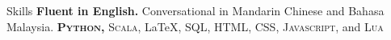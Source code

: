 
\begin{rubric}{Skills}
\textbf{Fluent in English.}  Conversational in Mandarin Chinese and Bahasa Malaysia.
\textbf{\textsc{Python,}}  
\textsc{Scala},
\LaTeX, 
SQL,
\textsc{HTML}, 
\textsc{CSS},
\textsc{Javascript}, and \textsc{Lua}
\end{rubric}
